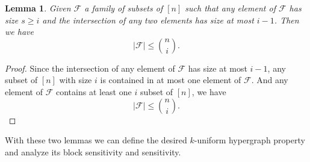 \documentclass[psamsfonts]{amsart}
\newtheorem{lem}[theorem]{Lemma}
\theoremstyle{definition}
\theoremstyle{remark}
\numberwithin{equation}{section}
\begin{document}
	\begin{lem}
		Given $\mathcal{F}$ a family of subsets of $[n]$ such that any element of $\mathcal{F}$ has size $s \geq i$ and the intersection of any two elements has size at most $i-1$. Then we have
		\begin{equation}
			|\mathcal{F}| \leq {n \choose{i}}.
		\end{equation}
	\end{lem}
	\begin{proof}
		Since the intersection of any element of $\mathcal{F}$ has size at most $i-1$, any subset of $[n]$ with size $i$ is contained in at most one element of $\mathcal{F}$. And any element of $\mathcal{F}$ contains at least one $i$ subset of $[n]$, we have 
		\begin{equation}
			|\mathcal{F}| \leq {n \choose{i}}.
		\end{equation}
	\end{proof}
	With these two lemmas we can define the desired $k$-uniform hypergraph property and analyze its block sensitivity and sensitivity.
\end{document}
